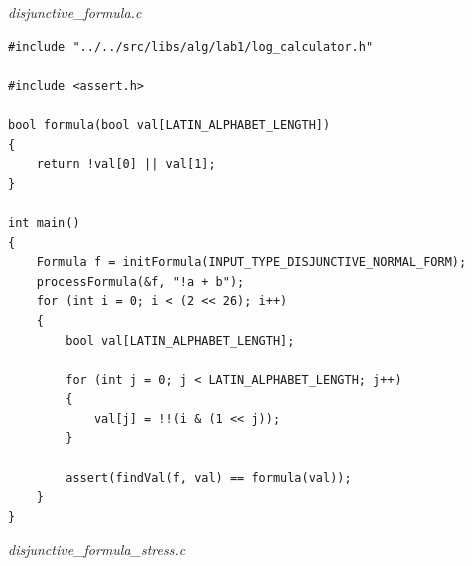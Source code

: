 \documentclass[a4paper,14pt]{extarticle}
\begin{document}
\textit{disjunctive\_formula.c}
\begin{verbatim}
#include "../../src/libs/alg/lab1/log_calculator.h"

#include <assert.h>

bool formula(bool val[LATIN_ALPHABET_LENGTH])
{
    return !val[0] || val[1];
}

int main()
{
    Formula f = initFormula(INPUT_TYPE_DISJUNCTIVE_NORMAL_FORM);
    processFormula(&f, "!a + b");
    for (int i = 0; i < (2 << 26); i++)
    {
        bool val[LATIN_ALPHABET_LENGTH];

        for (int j = 0; j < LATIN_ALPHABET_LENGTH; j++)
        {
            val[j] = !!(i & (1 << j));
        }

        assert(findVal(f, val) == formula(val));
    }
}
\end{verbatim}
\newpage
\textit{disjunctive\_formula\_stress.c}
\end{document}
